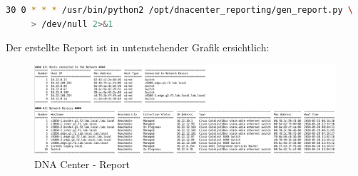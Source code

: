 \begin{lstlisting}[language=bash]
30 0 * * * /usr/bin/python2 /opt/dnacenter_reporting/gen_report.py \
     > /dev/null 2>&1
\end{lstlisting}

Der erstellte Report ist in untenstehender Grafik ersichtlich:

\begin{figure}[H]
	\centering
	\includegraphics[width=17cm]{img/secondtry/report.png}
	\caption{DNA Center - Report}
	\label{fig:Report}
\end{figure}